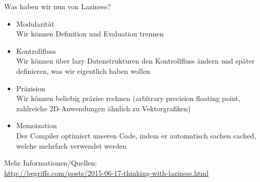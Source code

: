 \documentclass{beamer}
\begin{document}
\begin{frame}[fragile]
Was haben wir nun von Laziness?\\\pause
\begin{itemize}
 \item Modularität\\\pause
       Wir können Definition und Evaluation trennen
 \pause
 \item Kontrollfluss\\\pause
       Wir können über lazy Datenstrukturen den Kontrollfluss ändern und später definieren, was wir eigentlich haben wollen
 \pause
 \item Präzision\\\pause
       Wir können beliebig präzise rechnen (arbitrary precision floating point, zahlreiche 2D-Anwendungen ähnlich zu Vektorgrafiken)
 \pause
 \item Memoization\\\pause
       Der Compiler optimiert unseren Code, indem er automatisch sachen cached, welche mehrfach verwendet werden
\end{itemize}
\pause
Mehr Informationen/Quellen:\\
\url{http://begriffs.com/posts/2015-06-17-thinking-with-laziness.html}
\end{frame}
\end{document}
